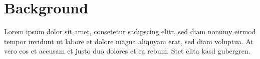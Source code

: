 \section{Background} \label{sec:background}
Lorem ipsum dolor sit amet, consetetur sadipscing elitr, sed diam nonumy eirmod tempor invidunt ut labore et dolore magna aliquyam erat, sed diam voluptua. At vero eos et accusam et justo duo dolores et ea rebum. Stet clita kasd gubergren.

